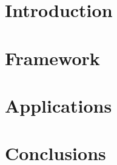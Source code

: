 \section[Intro]{Introduction}


\section[FRM]{Framework}


\section[Apps]{Applications}


\section[Concl]{Conclusions}
